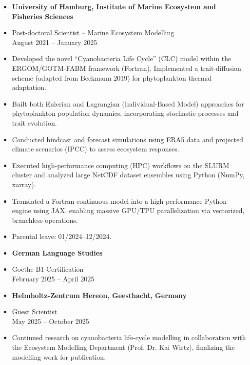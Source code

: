 \documentclass[margin,line,pifont,palatino,courier]{res}
\begin{document}
\begin{resume}
\begin{itemize}
\item {\bf University of Hamburg, Institute of Marine Ecosystem and Fisheries Sciences}\\
\vspace*{-.2in}
\item[] Post-doctoral Scientist -- Marine Ecosystem Modelling\\
August 2021 -- January 2025
\vspace*{.05in}
\item[-] Developed the novel ``Cyanobacteria Life Cycle'' (CLC) model within the ERGOM/GOTM-FABM framework (Fortran). Implemented a trait-diffusion scheme (adapted from Beckmann 2019) for phytoplankton thermal adaptation.
\item[-] Built both Eulerian and Lagrangian (Individual-Based Model) approaches for phytoplankton population dynamics, incorporating stochastic processes and trait evolution.
\item[-] Conducted hindcast and forecast simulations using ERA5 data and projected climate scenarios (IPCC) to assess ecosystem responses.
\item[-] Executed high-performance computing (HPC) workflows on the SLURM cluster and analyzed large NetCDF dataset ensembles using Python (NumPy, xarray).
\item[-] Translated a Fortran continuous model into a high-performance Python engine using JAX, enabling massive GPU/TPU parallelization via vectorized, branchless operations.
\item[-] Parental leave: 01/2024--12/2024.
\end{itemize}
\vspace*{.03in}

\begin{itemize}
\item {\bf German Language Studies}\\
\vspace*{-.2in}
\item[] Goethe B1 Certification\\
February 2025 -- April 2025
\end{itemize}
\vspace*{.03in}

\begin{itemize}
\item {\bf Helmholtz-Zentrum Hereon, Geesthacht, Germany}\\
\vspace*{-.2in}
\item[] Guest Scientist  \\
May 2025 -- October 2025
\vspace*{.03in}
\item[-] Continued research on cyanobacteria life-cycle modelling in collaboration with the Ecosystem Modelling Department (Prof. Dr. Kai Wirtz), finalizing the modelling work for publication.
\end{itemize}
\vspace*{.03in}


\end{resume}
\end{document}
